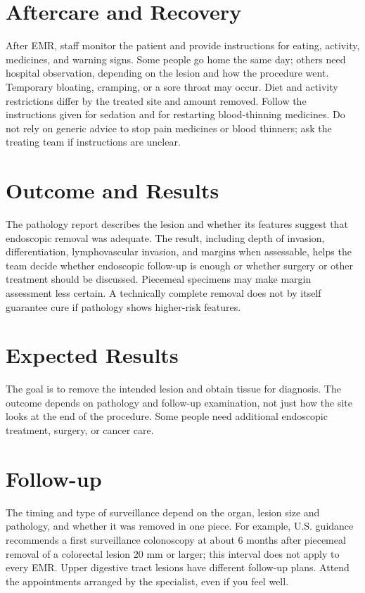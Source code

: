 \section*{Aftercare and Recovery}
After EMR, staff monitor the patient and provide instructions for eating, activity, medicines, and warning signs. Some people go home the same day; others need hospital observation, depending on the lesion and how the procedure went. Temporary bloating, cramping, or a sore throat may occur. Diet and activity restrictions differ by the treated site and amount removed. Follow the instructions given for sedation and for restarting blood-thinning medicines. Do not rely on generic advice to stop pain medicines or blood thinners; ask the treating team if instructions are unclear.

\section*{Outcome and Results}
The pathology report describes the lesion and whether its features suggest that endoscopic removal was adequate. The result, including depth of invasion, differentiation, lymphovascular invasion, and margins when assessable, helps the team decide whether endoscopic follow-up is enough or whether surgery or other treatment should be discussed. Piecemeal specimens may make margin assessment less certain. A technically complete removal does not by itself guarantee cure if pathology shows higher-risk features.

\section*{Expected Results}
The goal is to remove the intended lesion and obtain tissue for diagnosis. The outcome depends on pathology and follow-up examination, not just how the site looks at the end of the procedure. Some people need additional endoscopic treatment, surgery, or cancer care.

\section*{Follow-up}
The timing and type of surveillance depend on the organ, lesion size and pathology, and whether it was removed in one piece. For example, U.S. guidance recommends a first surveillance colonoscopy at about 6 months after piecemeal removal of a colorectal lesion 20 mm or larger; this interval does not apply to every EMR. Upper digestive tract lesions have different follow-up plans. Attend the appointments arranged by the specialist, even if you feel well.


